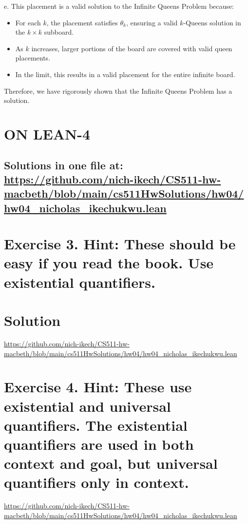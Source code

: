 \documentclass{article}
\begin{document}
e. This placement is a valid solution to the Infinite Queens Problem because:
   \begin{itemize}
     \item For each $k$, the placement satisfies $\theta_k$, ensuring a valid $k$-Queens solution in the $k \times k$ subboard.
     \item As $k$ increases, larger portions of the board are covered with valid queen placements.
     \item In the limit, this results in a valid placement for the entire infinite board.
   \end{itemize}

Therefore, we have rigorously shown that the Infinite Queens Problem has a solution.

\newpage







\section*{ON LEAN-4}
\subsection*{Solutions in one file at: 
\url{https://github.com/nich-ikech/CS511-hw-macbeth/blob/main/cs511HwSolutions/hw04/hw04_nicholas_ikechukwu.lean}}

\newpage

\section*{Exercise 3. Hint: These should be easy if you read the book. Use existential quantifiers.}
\section*{Solution}
\url{https://github.com/nich-ikech/CS511-hw-macbeth/blob/main/cs511HwSolutions/hw04/hw04_nicholas_ikechukwu.lean}

\newpage

\section*{Exercise 4. Hint: These use existential and universal quantifiers. The existential quantifiers are used in both
context and goal, but universal quantifiers only in context.}

\url{https://github.com/nich-ikech/CS511-hw-macbeth/blob/main/cs511HwSolutions/hw04/hw04_nicholas_ikechukwu.lean}
\end{document}
